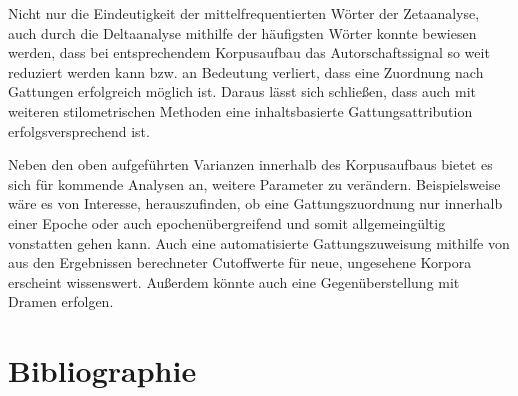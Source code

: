 \documentclass[a4paper,10p]{article}
\begin{document}
Nicht nur die Eindeutigkeit der mittelfrequentierten Wörter der Zetaanalyse, auch durch die Deltaanalyse mithilfe der häufigsten Wörter konnte bewiesen werden, dass bei entsprechendem Korpusaufbau das Autorschaftssignal so weit reduziert werden kann bzw. an Bedeutung verliert, dass eine Zuordnung nach Gattungen erfolgreich möglich ist. Daraus lässt sich schließen, dass auch mit weiteren stilometrischen Methoden eine inhaltsbasierte Gattungsattribution erfolgsversprechend ist. \par 

Neben den oben aufgeführten Varianzen innerhalb des Korpusaufbaus bietet es sich für kommende Analysen an, weitere Parameter zu verändern. Beispielsweise wäre es von Interesse, herauszufinden, ob eine Gattungszuordnung nur innerhalb einer Epoche oder auch epochenübergreifend und somit allgemeingültig vonstatten gehen kann. Auch eine automatisierte Gattungszuweisung mithilfe von aus den Ergebnissen berechneter Cutoffwerte für neue, ungesehene Korpora erscheint wissenswert. Außerdem könnte auch eine Gegenüberstellung mit Dramen erfolgen.






\section{Bibliographie}


\end{document}
